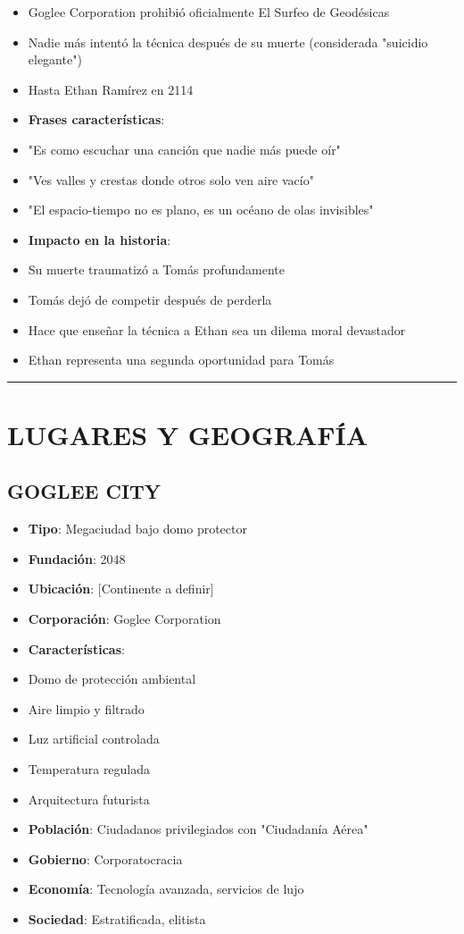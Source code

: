 \documentclass[11pt,a4paper]{report}
\begin{document}
\begin{itemize}
  \item Goglee Corporation prohibió oficialmente El Surfeo de Geodésicas
  \item Nadie más intentó la técnica después de su muerte (considerada "suicidio elegante")
  \item Hasta Ethan Ramírez en 2114
  \item \textbf{Frases características}: 
  \item "Es como escuchar una canción que nadie más puede oír"
  \item "Ves valles y crestas donde otros solo ven aire vacío"
  \item "El espacio-tiempo no es plano, es un océano de olas invisibles"
  \item \textbf{Impacto en la historia}: 
  \item Su muerte traumatizó a Tomás profundamente
  \item Tomás dejó de competir después de perderla
  \item Hace que enseñar la técnica a Ethan sea un dilema moral devastador
  \item Ethan representa una segunda oportunidad para Tomás

\end{itemize}
\bigskip\hrule\bigskip

\section{LUGARES Y GEOGRAFÍA}

\subsection{GOGLEE CITY}
\begin{itemize}
  \item \textbf{Tipo}: Megaciudad bajo domo protector
  \item \textbf{Fundación}: 2048
  \item \textbf{Ubicación}: [Continente a definir]
  \item \textbf{Corporación}: Goglee Corporation
  \item \textbf{Características}:
  \item Domo de protección ambiental
  \item Aire limpio y filtrado
  \item Luz artificial controlada
  \item Temperatura regulada
  \item Arquitectura futurista
  \item \textbf{Población}: Ciudadanos privilegiados con "Ciudadanía Aérea"
  \item \textbf{Gobierno}: Corporatocracia
  \item \textbf{Economía}: Tecnología avanzada, servicios de lujo
  \item \textbf{Sociedad}: Estratificada, elitista

\end{itemize}
\end{document}
